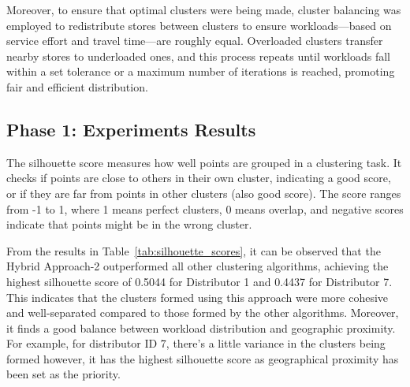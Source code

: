 Moreover, to ensure that optimal clusters were being made, cluster balancing was employed to redistribute 
stores between clusters to ensure workloads—based on service effort and travel time—are roughly equal.
 Overloaded clusters transfer nearby stores to underloaded ones, and this process repeats until workloads fall within a set tolerance or a maximum number of iterations is reached, promoting fair and efficient distribution.

\subsection{Phase 1: Experiments Results}
The silhouette score measures how well points are grouped in a clustering task. It checks if points are close to others in their own cluster, indicating a good score, or if they are far from points in other clusters (also good score). The score ranges from -1 to 1, where 1 means perfect clusters, 0 means overlap, and negative scores indicate that points might be in the wrong cluster.

\begin{table}[H]
    \centering
    \caption{Silhouette Score Comparison for Different Clustering Algorithms}
    \label{tab:silhouette_scores}
    \end{table}

From the results in Table~\ref{tab:silhouette_scores}, it can be observed that the Hybrid Approach-2 outperformed all other clustering algorithms, achieving the highest silhouette score of 0.5044 for Distributor 1 and 0.4437 for Distributor 7. This indicates that the clusters formed using this approach were more cohesive and well-separated compared to those formed by the other algorithms.
Moreover, it finds a good balance between workload distribution and geographic proximity. For example, for distributor ID 7, there's a little variance in the clusters being formed however, it has the highest silhouette score as geographical proximity has been set as the priority.



